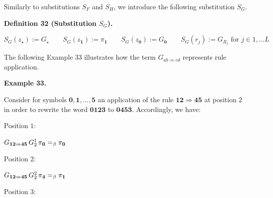  
 
Similarly to substitutions $S_{F}$ and $S_{H}$, we introduce the following substitution $S_{G}$.\par
 
 
 
\par\medskip\noindent\textbf{Definition 32 (Substitution $S_{G}$).}\par
 
 
\par
    \[S_{G}(z_{\star}):=G_{\star}\qquad S_{G}(z_{\mathbf{1}}):=\pi_{\mathbf{1}}%
\qquad S_{G}(z_{\mathbf{0}}):=G_{\mathbf{0}}\qquad S_{G}(r_{j}):=G_{R_{j}}%
\text{ for }j\in{1,\ldots L}\]    
 
 
 
The following Example 33 illustrates how the term $G_{ab\Rightarrow cd}$ represents rule application.\par
 
 
 
\par\medskip\noindent\textbf{Example 33.}\par
 
 
Consider for symbols $\mathbf{0},\mathbf{1},\ldots,\mathbf{5}$ an application of the rule $\mathbf{1}\mathbf{2}\Rightarrow\mathbf{4}\mathbf{5}$ at position $2$ in order to rewrite the word $\mathbf{0}\mathbf{1}\mathbf{2}\mathbf{3}$ to $\mathbf{0}\mathbf{4}\mathbf{5}\mathbf{3}$. Accordingly, we have:\par
  Position $1$:  
 
$G_{\mathbf{1}\mathbf{2}\Rightarrow\mathbf{4}\mathbf{5}}\,G_{2}^{1}\,\pi_{%
\mathbf{0}}=_{\beta}\pi_{\mathbf{0}}$\par
 
  Position $2$:  
 
$G_{\mathbf{1}\mathbf{2}\Rightarrow\mathbf{4}\mathbf{5}}\,G_{2}^{2}\,\pi_{%
\mathbf{4}}=_{\beta}\pi_{\mathbf{1}}$\par
 
  Position $3$:  
 

